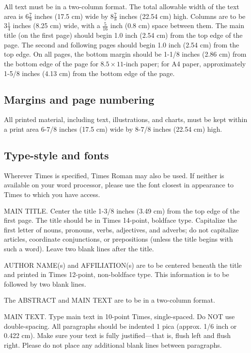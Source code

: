 \documentclass[10pt,twocolumn,letterpaper]{article}
\begin{document}
All text must be in a two-column format. The total allowable width of the
text area is $6\frac78$ inches (17.5 cm) wide by $8\frac78$ inches (22.54
cm) high. Columns are to be $3\frac14$ inches (8.25 cm) wide, with a
$\frac{5}{16}$ inch (0.8 cm) space between them. The main title (on the
first page) should begin 1.0 inch (2.54 cm) from the top edge of the
page. The second and following pages should begin 1.0 inch (2.54 cm) from
the top edge. On all pages, the bottom margin should be 1-1/8 inches (2.86
cm) from the bottom edge of the page for $8.5 \times 11$-inch paper; for A4
paper, approximately 1-5/8 inches (4.13 cm) from the bottom edge of the
page.

\subsection{Margins and page numbering}

All printed material, including text, illustrations, and charts, must be
kept within a print area 6-7/8 inches (17.5 cm) wide by 8-7/8 inches
(22.54 cm) high.


\subsection{Type-style and fonts}

Wherever Times is specified, Times Roman may also be used. If neither is
available on your word processor, please use the font closest in
appearance to Times to which you have access.

MAIN TITLE. Center the title 1-3/8 inches (3.49 cm) from the top edge of
the first page. The title should be in Times 14-point, boldface type.
Capitalize the first letter of nouns, pronouns, verbs, adjectives, and
adverbs; do not capitalize articles, coordinate conjunctions, or
prepositions (unless the title begins with such a word). Leave two blank
lines after the title.

AUTHOR NAME(s) and AFFILIATION(s) are to be centered beneath the title
and printed in Times 12-point, non-boldface type. This information is to
be followed by two blank lines.

The ABSTRACT and MAIN TEXT are to be in a two-column format.

MAIN TEXT. Type main text in 10-point Times, single-spaced. Do NOT use
double-spacing. All paragraphs should be indented 1 pica (approx. 1/6
inch or 0.422 cm). Make sure your text is fully justified---that is,
flush left and flush right. Please do not place any additional blank
lines between paragraphs.
\end{document}
